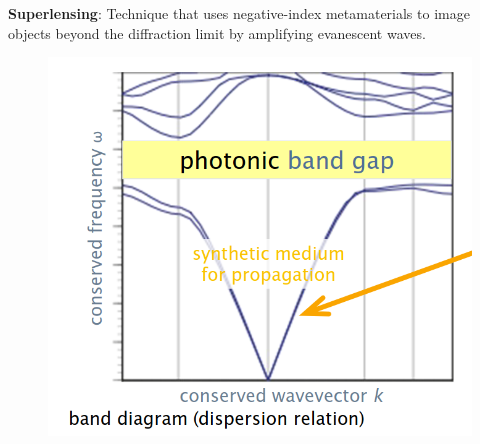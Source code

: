 \textbf{Superlensing}: Technique that uses negative-index metamaterials to image objects beyond the diffraction limit by amplifying evanescent waves.
\begin{figure}[!ht]
    \centering
    \includegraphics[width=0.7\columnwidth]{images/bandDiagramm.png}
    \label{fig:superlensing}
\end{figure}